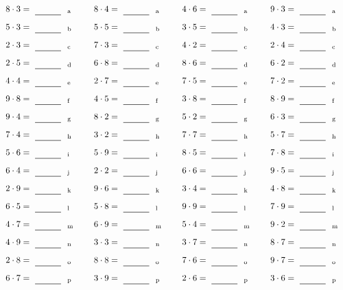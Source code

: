 \documentclass
[
  draft    = true,
  fontsize = 11pt,
  parskip  = half-
]
{scrartcl}
\begin{document}
\par\vfill\par
\begin{align*}
    \pline{8\cdot3}&=\rline{a}
  & \pline{8\cdot4}&=\rline{a}
  & \pline{4\cdot6}&=\rline{a}
  & \pline{9\cdot3}&=\rline{a} \\[1ex]
    \pline{5\cdot3}&=\rline{b}
  & \pline{5\cdot5}&=\rline{b}
  & \pline{3\cdot5}&=\rline{b}
  & \pline{4\cdot3}&=\rline{b} \\[1ex]
    \pline{2\cdot3}&=\rline{c}
  & \pline{7\cdot3}&=\rline{c}
  & \pline{4\cdot2}&=\rline{c}
  & \pline{2\cdot4}&=\rline{c} \\[1ex]
    \pline{2\cdot5}&=\rline{d}
  & \pline{6\cdot8}&=\rline{d}
  & \pline{8\cdot6}&=\rline{d}
  & \pline{6\cdot2}&=\rline{d} \\[1ex]
    \pline{4\cdot4}&=\rline{e}
  & \pline{2\cdot7}&=\rline{e}
  & \pline{7\cdot5}&=\rline{e}
  & \pline{7\cdot2}&=\rline{e} \\[1ex]
    \pline{9\cdot8}&=\rline{f}
  & \pline{4\cdot5}&=\rline{f}
  & \pline{3\cdot8}&=\rline{f}
  & \pline{8\cdot9}&=\rline{f} \\[1ex]
    \pline{9\cdot4}&=\rline{g}
  & \pline{8\cdot2}&=\rline{g}
  & \pline{5\cdot2}&=\rline{g}
  & \pline{6\cdot3}&=\rline{g} \\[1ex]
    \pline{7\cdot4}&=\rline{h}
  & \pline{3\cdot2}&=\rline{h}
  & \pline{7\cdot7}&=\rline{h}
  & \pline{5\cdot7}&=\rline{h} \\[1ex]
    \pline{5\cdot6}&=\rline{i}
  & \pline{5\cdot9}&=\rline{i}
  & \pline{8\cdot5}&=\rline{i}
  & \pline{7\cdot8}&=\rline{i} \\[1ex]
    \pline{6\cdot4}&=\rline{j}
  & \pline{2\cdot2}&=\rline{j}
  & \pline{6\cdot6}&=\rline{j}
  & \pline{9\cdot5}&=\rline{j} \\[1ex]
    \pline{2\cdot9}&=\rline{k}
  & \pline{9\cdot6}&=\rline{k}
  & \pline{3\cdot4}&=\rline{k}
  & \pline{4\cdot8}&=\rline{k} \\[1ex]
    \pline{6\cdot5}&=\rline{l}
  & \pline{5\cdot8}&=\rline{l}
  & \pline{9\cdot9}&=\rline{l}
  & \pline{7\cdot9}&=\rline{l} \\[1ex]
    \pline{4\cdot7}&=\rline{m}
  & \pline{6\cdot9}&=\rline{m}
  & \pline{5\cdot4}&=\rline{m}
  & \pline{9\cdot2}&=\rline{m} \\[1ex]
    \pline{4\cdot9}&=\rline{n}
  & \pline{3\cdot3}&=\rline{n}
  & \pline{3\cdot7}&=\rline{n}
  & \pline{8\cdot7}&=\rline{n} \\[1ex]
    \pline{2\cdot8}&=\rline{o}
  & \pline{8\cdot8}&=\rline{o}
  & \pline{7\cdot6}&=\rline{o}
  & \pline{9\cdot7}&=\rline{o} \\[1ex]
    \pline{6\cdot7}&=\rline{p}
  & \pline{3\cdot9}&=\rline{p}
  & \pline{2\cdot6}&=\rline{p}
  & \pline{3\cdot6}&=\rline{p}
\end{align*}
\end{document}
